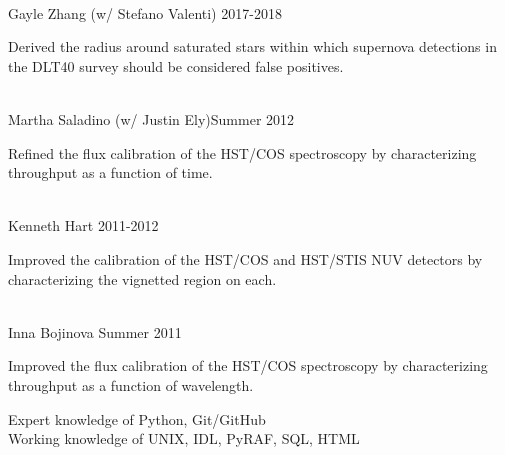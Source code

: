 \documentclass[10pt]{cv}
\begin{document}
\begin{llist}
\begin{minipage}[l]{0.7\textwidth}
\end{minipage}\vspace{0.15cm}
\\
Gayle Zhang (w/ Stefano Valenti) \hfill 2017-2018\\
\begin{minipage}[l]{0.7\textwidth}\vspace{0.15cm}
Derived the radius around saturated stars within which supernova detections in the DLT40 survey should be considered false positives.\\
\end{minipage}\vspace{0.15cm}
\\
Martha Saladino (w/ Justin Ely)\hfill Summer 2012\\
\begin{minipage}[l]{0.7\textwidth}\vspace{0.15cm}
Refined the flux calibration of the HST/COS spectroscopy by characterizing throughput as a function of time.\\
\end{minipage}\vspace{0.15cm}
\\
Kenneth Hart \hfill 2011-2012\\
\begin{minipage}[l]{0.7\textwidth}\vspace{0.15cm}
Improved the calibration of the HST/COS and HST/STIS NUV detectors by characterizing the vignetted region on each.\\
\end{minipage}\vspace{0.15cm}
\\
Inna Bojinova \hfill Summer 2011\\
\begin{minipage}[l]{0.7\textwidth}\vspace{0.15cm}
Improved the flux calibration of the HST/COS spectroscopy by characterizing throughput as a function of wavelength.\\
\end{minipage}\vspace{0.15cm}
\vspace{-0.1in}  
Expert knowledge of Python, Git/GitHub\\
Working knowledge of UNIX, IDL, PyRAF, SQL, HTML\\

\end{llist}
\end{document}
